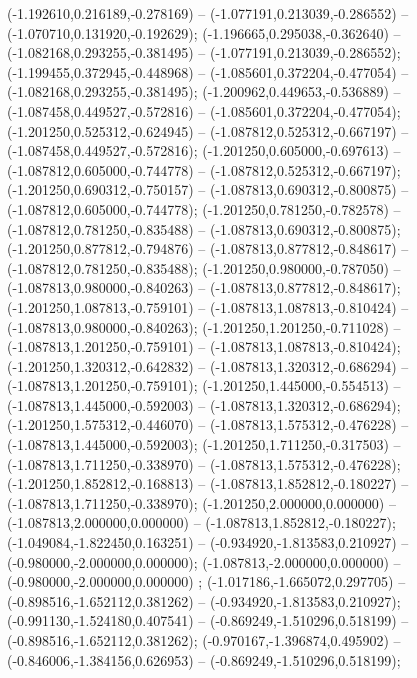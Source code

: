  (-1.192610,0.216189,-0.278169) -- (-1.077191,0.213039,-0.286552) -- (-1.070710,0.131920,-0.192629);
 (-1.196665,0.295038,-0.362640) -- (-1.082168,0.293255,-0.381495) -- (-1.077191,0.213039,-0.286552);
 (-1.199455,0.372945,-0.448968) -- (-1.085601,0.372204,-0.477054) -- (-1.082168,0.293255,-0.381495);
 (-1.200962,0.449653,-0.536889) -- (-1.087458,0.449527,-0.572816) -- (-1.085601,0.372204,-0.477054);
 (-1.201250,0.525312,-0.624945) -- (-1.087812,0.525312,-0.667197) -- (-1.087458,0.449527,-0.572816);
 (-1.201250,0.605000,-0.697613) -- (-1.087812,0.605000,-0.744778) -- (-1.087812,0.525312,-0.667197);
 (-1.201250,0.690312,-0.750157) -- (-1.087813,0.690312,-0.800875) -- (-1.087812,0.605000,-0.744778);
 (-1.201250,0.781250,-0.782578) -- (-1.087812,0.781250,-0.835488) -- (-1.087813,0.690312,-0.800875);
 (-1.201250,0.877812,-0.794876) -- (-1.087813,0.877812,-0.848617) -- (-1.087812,0.781250,-0.835488);
 (-1.201250,0.980000,-0.787050) -- (-1.087813,0.980000,-0.840263) -- (-1.087813,0.877812,-0.848617);
 (-1.201250,1.087813,-0.759101) -- (-1.087813,1.087813,-0.810424) -- (-1.087813,0.980000,-0.840263);
 (-1.201250,1.201250,-0.711028) -- (-1.087813,1.201250,-0.759101) -- (-1.087813,1.087813,-0.810424);
 (-1.201250,1.320312,-0.642832) -- (-1.087813,1.320312,-0.686294) -- (-1.087813,1.201250,-0.759101);
 (-1.201250,1.445000,-0.554513) -- (-1.087813,1.445000,-0.592003) -- (-1.087813,1.320312,-0.686294);
 (-1.201250,1.575312,-0.446070) -- (-1.087813,1.575312,-0.476228) -- (-1.087813,1.445000,-0.592003);
 (-1.201250,1.711250,-0.317503) -- (-1.087813,1.711250,-0.338970) -- (-1.087813,1.575312,-0.476228);
 (-1.201250,1.852812,-0.168813) -- (-1.087813,1.852812,-0.180227) -- (-1.087813,1.711250,-0.338970);
 (-1.201250,2.000000,0.000000) -- (-1.087813,2.000000,0.000000) -- (-1.087813,1.852812,-0.180227);
 (-1.049084,-1.822450,0.163251) -- (-0.934920,-1.813583,0.210927) -- (-0.980000,-2.000000,0.000000);
 (-1.087813,-2.000000,0.000000) -- (-0.980000,-2.000000,0.000000) ;
 (-1.017186,-1.665072,0.297705) -- (-0.898516,-1.652112,0.381262) -- (-0.934920,-1.813583,0.210927);
 (-0.991130,-1.524180,0.407541) -- (-0.869249,-1.510296,0.518199) -- (-0.898516,-1.652112,0.381262);
 (-0.970167,-1.396874,0.495902) -- (-0.846006,-1.384156,0.626953) -- (-0.869249,-1.510296,0.518199);
